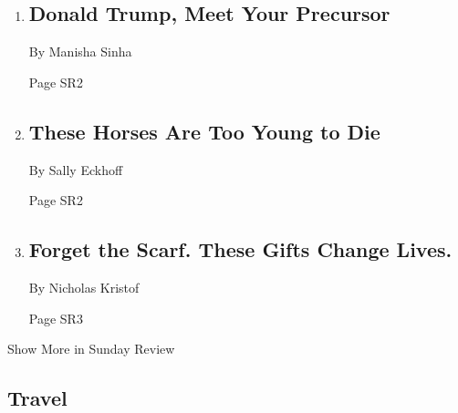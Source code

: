 \begin{enumerate}
\def\labelenumi{\arabic{enumi}.}
\item
  \href{/2019/11/29/opinion/sunday/andrew-johnson-donald-trump.html}{}

  \hypertarget{donald-trump-meet-your-precursor}{%
  \subsection{Donald Trump, Meet Your
  Precursor}\label{donald-trump-meet-your-precursor}}

  By Manisha Sinha

  Page SR2
\item
  \href{/2019/11/30/opinion/sunday/horse-racing-early-deaths.html}{}

  \hypertarget{these-horses-are-too-young-to-die}{%
  \subsection{These Horses Are Too Young to
  Die}\label{these-horses-are-too-young-to-die}}

  By Sally Eckhoff

  Page SR2
\item
  \href{/2019/11/30/opinion/sunday/holiday-gift-guide.html}{}

  \hypertarget{forget-the-scarf-these-gifts-change-lives}{%
  \subsection{Forget the Scarf. These Gifts Change
  Lives.}\label{forget-the-scarf-these-gifts-change-lives}}

  By Nicholas Kristof

  Page SR3
\end{enumerate}

Show More in Sunday Review

\hypertarget{travel}{%
\subsection{Travel}\label{travel}}

